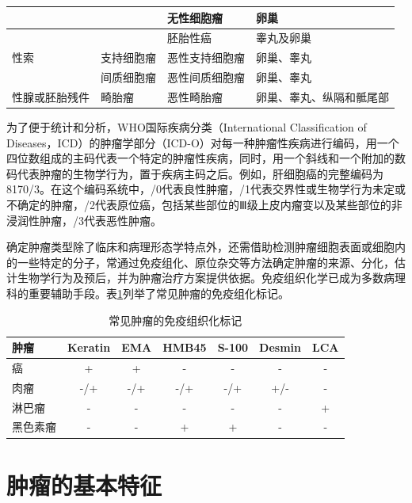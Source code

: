 \begin{longtable}[]{lm{3cm}m{3cm}m{3cm}}
                             &                      & 无性细胞瘤           & 卵巢
  \\\hline
                             &                      & 胚胎性癌             & 睾丸及卵巢
  \\\hline
  \quad 性索                 & 支持细胞瘤           & 恶性支持细胞瘤       & 卵巢、睾丸
  \\\hline
                             & 间质细胞瘤           & 恶性间质细胞瘤       & 卵巢、睾丸
  \\\hline
  \quad 性腺或胚胎残件       & 畸胎瘤               & 恶性畸胎瘤           & 卵巢、睾丸、纵隔和骶尾部
  \\
  \bottomrule
\end{longtable}


为了便于统计和分析，WHO国际疾病分类（International Classification of
Diseases，ICD）的肿瘤学部分（ICD-O）对每一种肿瘤性疾病进行编码，用一个四位数组成的主码代表一个特定的肿瘤性疾病，同时，用一个斜线和一个附加的数码代表肿瘤的生物学行为，置于疾病主码之后。例如，肝细胞癌的完整编码为8170/3。在这个编码系统中，/0代表良性肿瘤，/1代表交界性或生物学行为未定或不确定的肿瘤，/2代表原位癌，包括某些部位的Ⅲ级上皮内瘤变以及某些部位的非浸润性肿瘤，/3代表恶性肿瘤。

确定肿瘤类型除了临床和病理形态学特点外，还需借助检测肿瘤细胞表面或细胞内的一些特定的分子，常通过免疫组化、原位杂交等方法确定肿瘤的来源、分化，估计生物学行为及预后，并为肿瘤治疗方案提供依据。免疫组织化学已成为多数病理科的重要辅助手段。表\ref{tab5-2}列举了常见肿瘤的免疫组化标记。

\begin{table}[ht]
  \caption{常见肿瘤的免疫组织化标记}
  \label{tab5-2}
  \centering
  \begin{tabular}{lcccccc}
    \toprule
    肿瘤     & Keratin & EMA & HMB45 & S-100 & Desmin & LCA \\
    \midrule
    癌       & +       & +   & -     & -     & -      & -   \\
    肉瘤     & -/+     & -/+ & -/+   & -/+   & +/-    & -   \\
    淋巴瘤   & -       & -   & -     & -     & -      & +   \\
    黑色素瘤 & -       & -   & +     & +     & -      & -   \\
    \bottomrule
  \end{tabular}
\end{table}

\section{肿瘤的基本特征}

